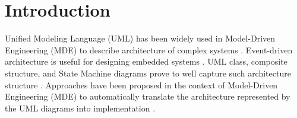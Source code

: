 \section{Introduction}
\label{sec:intro}





Unified Modeling Language (UML) has been widely used in Model-Driven Engineering (MDE) to describe architecture of complex systems \cite{HUTCHINSON2014144}.
Event-driven architecture is useful for designing 
embedded systems \cite{Dunkels:2006:PSE:1182807.1182811}.
UML class, composite structure, and State Machine diagrams prove to well capture such architecture structure \cite{possepapyrusrt,Ringert2013}.    
Approaches have been proposed in the context of Model-Driven Engineering (MDE) to automatically translate the architecture represented by the UML diagrams into implementation \cite{possepapyrusrt, Ringert2013,ibm_rhapsody}.

